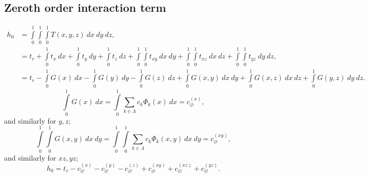 \documentclass[11pt]{article}
\newcommand{\intz}{\ensuremath{\int\limits_0^1}}
\begin{document}
\subsection{Zeroth order interaction term}
\begin{align}
  h_0 &= \intz\intz\intz T(x,y,z)\ dx\ dy\ dz, \\
    &= t_r + \intz t_x\ dx + \intz t_y\ dy + \intz t_z\ dz +\intz\intz t_{xy}\ dx\ dy +\intz\intz t_{xz}\ dx\
      dz +\intz\intz t_{yz}\ dy\ dz, \\
    &= t_r - \intz G(x)\ dx - \intz G(y)\ dy - \intz G(z)\ dz + \intz G(x,y)\ dx\ dy + \intz G(x,z)\ dx\ dz +
      \intz G(y,z)\ dy\ dz.
\end{align}
\begin{equation}
  \intz G(x)\ dx = \intz \sum_{k\in\Lambda} c_k\Phi_k(x)\ dx = c^{(x)}_\varnothing,
\end{equation}
and similarly for $y,z$;
\begin{equation}
  \intz\intz G(x,y)\ dx\ dy = \intz\intz \sum_{k\in\Lambda} c_k\Phi_k(x,y)\ dx\ dy = c^{(xy)}_\varnothing,
\end{equation}
and similarly for $xz,yz$;
\begin{equation}
  h_0 = t_r - c^{(x)}_\varnothing - c^{(y)}_\varnothing - c^{(z)}_\varnothing + c^{(xy)}_\varnothing +
        c^{(xz)}_\varnothing + c^{(yz)}_\varnothing.
\end{equation}
\end{document}
